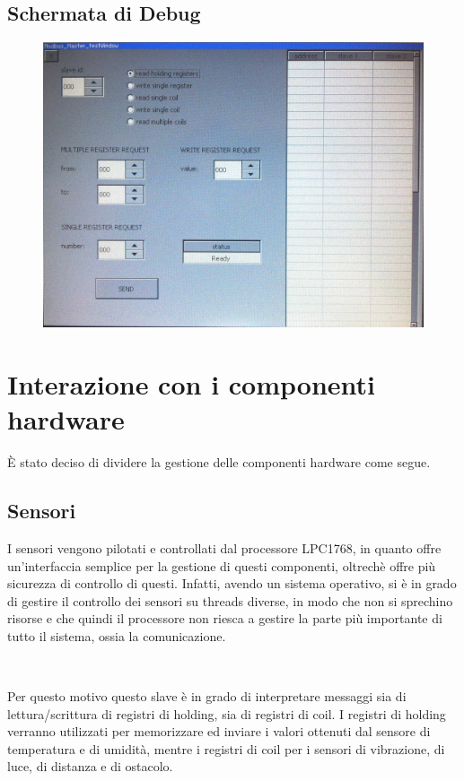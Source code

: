 \documentclass[a4paper,titlepage]{book}
\begin{document}
\newpage
\subsection{Schermata di Debug}

\begin{figure}[!h]
\centering
\includegraphics[scale=0.1]{debug.jpg}
\end{figure}


\section{Interazione con i componenti hardware}

È stato deciso di dividere la gestione delle componenti hardware come segue.

\subsection{Sensori}

I sensori vengono pilotati e controllati dal processore LPC1768, in quanto offre un'interfaccia semplice per la gestione di questi componenti, oltrechè offre più sicurezza di controllo di questi. Infatti, avendo un sistema operativo, si è in grado di gestire il controllo dei sensori su threads diverse, in modo che non si sprechino risorse e che quindi il processore non riesca a gestire la parte più importante di tutto il sistema, ossia la comunicazione.

~

Per questo motivo questo slave è in grado di interpretare messaggi sia di lettura/scrittura di registri di holding, sia di registri di coil. I registri di holding verranno utilizzati per memorizzare ed inviare i valori ottenuti dal sensore di temperatura e di umidità, mentre i registri di coil per i sensori di vibrazione, di luce, di distanza e di ostacolo.
\end{document}
